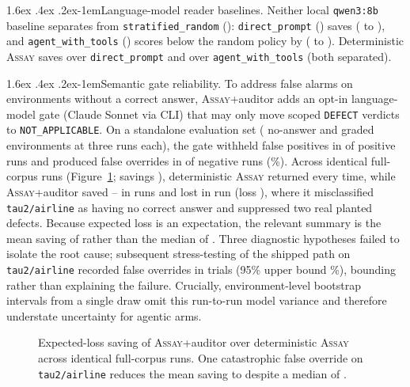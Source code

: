 \documentclass[11pt]{article}
\makeatletter
\renewcommand\paragraph{\@startsection{paragraph}{4}{\z@}%
  {1.6ex \@plus .4ex \@minus .2ex}{-1em}{\normalfont\normalsize\bfseries}}
\newcommand{\assay}{\textsc{Assay}}
\makeatother
\begin{document}
\paragraph{Language-model reader baselines.} Neither local \texttt{qwen3:8b} baseline separates from
\texttt{stratified\_random} (\lossStratRandom{}): \texttt{direct\_prompt} (\lossDirectPrompt{})
saves \savedDPvsRandom{} (\loSavedDPvsRandom{} to \hiSavedDPvsRandom{}), and
\texttt{agent\_with\_tools} (\lossAgentTools{}) scores below the random policy by
\savedRandomVsAT{} (\loSavedRandomVsAT{} to \hiSavedRandomVsAT{}). Deterministic \assay{} saves
\savedDirectPrompt{} over \texttt{direct\_prompt} and \savedAgentTools{} over
\texttt{agent\_with\_tools} (both separated).

\paragraph{Semantic gate reliability.} To address false alarms on environments without a correct
answer, \assay{}+auditor adds an opt-in language-model gate (Claude Sonnet via CLI) that may only
move scoped \texttt{DEFECT} verdicts to \texttt{NOT\_APPLICABLE}. On a standalone evaluation set
(\sgNPos{} no-answer and \sgNNeg{} graded environments at three runs each), the gate withheld false
positives in \sgTPRuns{} of \sgPosRuns{} positive runs and produced false overrides in \sgFPRuns{}
of \sgNegRuns{} negative runs (\sgFPPct{}\%). Across \gateRuns{} identical full-corpus runs
(Figure~\ref{fig:gate}; savings \gateRunValues{}), deterministic \assay{} returned \gateDetLoss{}
every time, while \assay{}+auditor saved \gateGoodMin--\gateGoodMax{} in \gateGoodRuns{} runs and
lost \gateWorstSaved{} in \gateBadRuns{} run (loss \gateWorstLoss{}), where it misclassified
\texttt{tau2/airline} as having no correct answer and suppressed two real planted defects. Because
expected loss is an expectation, the relevant summary is the mean saving of \gateMeanSaved{} rather
than the median of \gateMedianSaved{}. Three diagnostic hypotheses failed to isolate the root cause;
subsequent stress-testing of the shipped path on \texttt{tau2/airline} recorded \foFalse{} false
overrides in \foTrials{} trials (95\% upper bound \foUpper{}\%), bounding rather than explaining the
failure. Crucially, environment-level bootstrap intervals from a single draw omit this run-to-run
model variance and therefore understate uncertainty for agentic arms.

\begin{figure}[t]\centering

\caption{Expected-loss saving of \assay{}+auditor over deterministic \assay{} across \gateRuns{}
identical full-corpus runs. One catastrophic false override on \texttt{tau2/airline} reduces the
mean saving to \gateMeanSaved{} despite a median of \gateMedianSaved{}.}
\label{fig:gate}
\end{figure}
\end{document}
